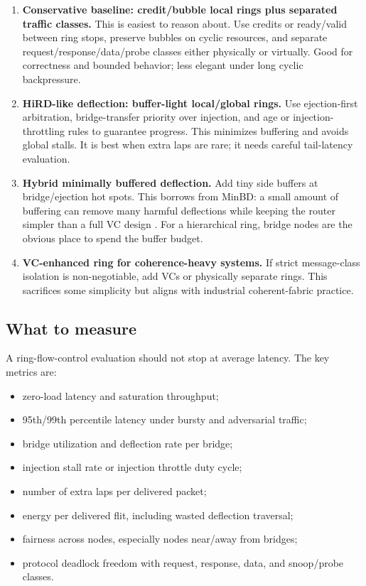 \documentclass[11pt]{article}
\newcommand{\term}[1]{\textbf{#1}}
\begin{document}
\begin{enumerate}
  \item \term{Conservative baseline: credit/bubble local rings plus separated traffic classes.} This is easiest to reason about. Use credits or ready/valid between ring stops, preserve bubbles on cyclic resources, and separate request/response/data/probe classes either physically or virtually. Good for correctness and bounded behavior; less elegant under long cyclic backpressure.
  \item \term{HiRD-like deflection: buffer-light local/global rings.} Use ejection-first arbitration, bridge-transfer priority over injection, and age or injection-throttling rules to guarantee progress. This minimizes buffering and avoids global stalls. It is best when extra laps are rare; it needs careful tail-latency evaluation.
  \item \term{Hybrid minimally buffered deflection.} Add tiny side buffers at bridge/ejection hot spots. This borrows from MinBD: a small amount of buffering can remove many harmful deflections while keeping the router simpler than a full VC design \cite{Fallin2012MinBD}. For a hierarchical ring, bridge nodes are the obvious place to spend the buffer budget.
  \item \term{VC-enhanced ring for coherence-heavy systems.} If strict message-class isolation is non-negotiable, add VCs or physically separate rings. This sacrifices some simplicity but aligns with industrial coherent-fabric practice.
\end{enumerate}

\subsection{What to measure}

A ring-flow-control evaluation should not stop at average latency. The key metrics are:

\begin{itemize}
  \item zero-load latency and saturation throughput;
  \item 95th/99th percentile latency under bursty and adversarial traffic;
  \item bridge utilization and deflection rate per bridge;
  \item injection stall rate or injection throttle duty cycle;
  \item number of extra laps per delivered packet;
  \item energy per delivered flit, including wasted deflection traversal;
  \item fairness across nodes, especially nodes near/away from bridges;
  \item protocol deadlock freedom with request, response, data, and snoop/probe classes.
\end{itemize}
\end{document}
